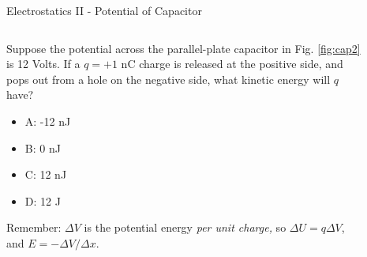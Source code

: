 \documentclass{beamer}
\begin{document}
\begin{frame}{Electrostatics II - Potential of Capacitor}
\small
\begin{columns}[T]
\begin{column}{0.5\textwidth}
Suppose the potential across the parallel-plate capacitor in Fig. \ref{fig:cap2} is 12 Volts.  If a $q = +1$ nC charge is released at the positive side, and pops out from a hole on the negative side, what kinetic energy will $q$ have?
\begin{itemize}
\item A: -12 nJ
\item B: 0 nJ
\item C: 12 nJ
\item D: 12 J
\end{itemize}
\footnotesize
Remember: $\Delta V$ is the potential energy \textit{per unit charge,} so $\Delta U = q \Delta V$, and $E = -\Delta V / \Delta x$.
\end{column}
\begin{column}{0.275\textwidth}
\begin{figure}

\end{figure}
\end{column}
\end{columns}
\end{frame}
\end{document}
